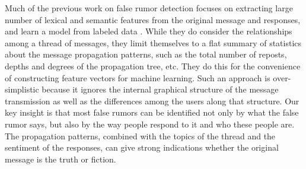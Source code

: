 Much of the  previous work on false rumor detection focuses
on extracting large number of lexical and semantic features
from the original message and
responses, and learn a model from labeled data
\cite{castillo2011information,qazvinian2011rumor}.
While they do consider the relationships among a thread
of messages, they limit themselves to a flat summary of statistics about
the message propagation patterns, such as the total number of reposts,
depths and degrees of the propagation tree, etc.
They do this for the convenience
of constructing feature vectors for machine learning.
Such an approach is over-simplistic because it ignores the internal
graphical structure of the message transmission as well as the
differences among the users along that structure. Our key insight is
that most false rumors can be identified not only by what the
false rumor says,
but also by the way people respond to it and who these people are.
The propagation patterns, combined with the topics of the thread
and the sentiment of the responses, can give strong
indications whether the original message is the truth or fiction.

%
%

